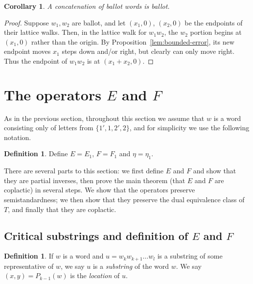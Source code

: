 \documentclass[10pt]{amsart}
\newtheorem{coro}[theorem]{Corollary}
\theoremstyle{definition}
\newtheorem{defi}[theorem]{Definition}
\newcommand{\defn}[1]{\emph{#1}}
\begin{document}
\begin{coro} 
\label{cor:concat-ballot}
A concatenation of ballot words is ballot.
\end{coro}
\begin{proof}
Suppose $w_1, w_2$ are ballot, and let $(x_1,0)$, $(x_2,0)$ be the endpoints of their lattice walks. Then, in the lattice walk for $w_1w_2$, the $w_2$ portion begins at $(x_1,0)$ rather than the origin. By Proposition~\ref{lem:bounded-error}, its new endpoint moves $x_1$ steps down and/or right, but clearly can only move right. Thus the endpoint of $w_1w_2$ is at $(x_1+x_2,0)$.
\end{proof}

\section{The operators \texorpdfstring{$E$}{E} and \texorpdfstring{$F$}{F}}\label{sec:unprimed-ops}

As in the previous section, throughout this section we assume that $w$ is a word consisting only of letters from $\{1',1,2',2\}$, and for simplicity we use the following notation.

\begin{defi}
Define $E=E_1$, $F=F_1$ and $\eta = \eta_1$.
\end{defi}

There are several parts to this section: we first define $E$ and $F$ and show that they are partial inverses, then prove the main theorem (that $E$ and $F$ are coplactic) in several steps. We show that the operators preserve semistandardness; we then show that they preserve the dual equivalence class of $T$, and finally that they are coplactic.

\subsection{Critical substrings and definition of \texorpdfstring{$E$}{E} and \texorpdfstring{$F$}{F}}\label{sec:EFdefinition}

\begin{defi}
If $w$ is a word and $u = w_k w_{k+1} \dots w_l$ is a substring of some representative of $w$, we say $u$ is a \emph{substring} of the word $w$. We say $(x,y) = P_{k-1}(w)$ is the \defn{location} of $u$.
\end{defi}
\end{document}
